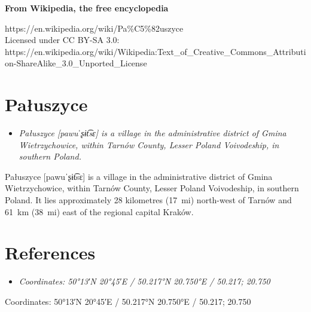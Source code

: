 \textbf{From Wikipedia, the free encyclopedia}

https://en.wikipedia.org/wiki/Pa\%C5\%82uszyce\\
Licensed under CC BY-SA 3.0:\\
https://en.wikipedia.org/wiki/Wikipedia:Text\_of\_Creative\_Commons\_Attribution-ShareAlike\_3.0\_Unported\_License

\section{Pałuszyce}\label{paux142uszyce}

\begin{itemize}
\item
  \emph{Pałuszyce {[}pawuˈʂɨt͡sɛ{]} is a village in the administrative
  district of Gmina Wietrzychowice, within Tarnów County, Lesser Poland
  Voivodeship, in southern Poland.}
\end{itemize}

Pałuszyce {[}pawuˈʂɨt͡sɛ{]} is a village in the administrative district
of Gmina Wietrzychowice, within Tarnów County, Lesser Poland
Voivodeship, in southern Poland. It lies approximately 28 kilometres
(17~mi) north-west of Tarnów and 61~km (38~mi) east of the regional
capital Kraków.

\section{References}\label{references}

\begin{itemize}
\item
  \emph{Coordinates: 50°13′N 20°45′E﻿ / ﻿50.217°N 20.750°E﻿ / 50.217;
  20.750}
\end{itemize}

Coordinates: 50°13′N 20°45′E﻿ / ﻿50.217°N 20.750°E﻿ / 50.217; 20.750
